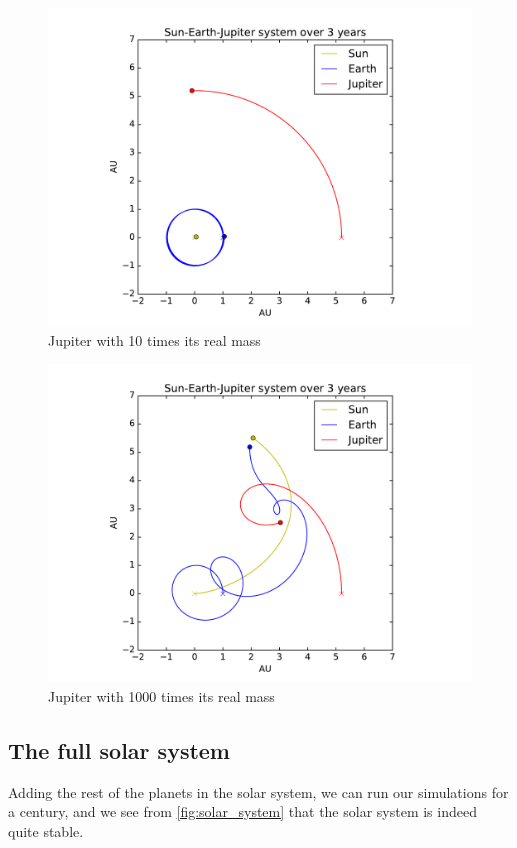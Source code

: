 \documentclass[a4paper]{article}
\begin{document}
\begin{figure}[htb]
\includegraphics[width=\textwidth]{fig/jupitermass_10.pdf}
\caption{Jupiter with 10 times its real mass}
\label{fig:jupiter:10times}
\end{figure}

\begin{figure}[htb]
\includegraphics[width=\textwidth]{fig/jupitermass_1000.pdf}
\caption{Jupiter with 1000 times its real mass}
\label{fig:jupiter:1000times}
\end{figure}


\subsection{The full solar system}
Adding the rest of the planets in the solar system, we can run our simulations for a century, and we see from \vref{fig:solar_system} that the solar system is indeed quite stable.
\end{document}
